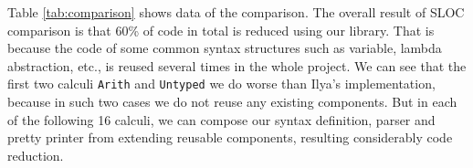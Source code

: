 Table \ref{tab:comparison} shows data of the comparison. The overall result of SLOC comparison is that 60\% of code in total is reduced using our library. That is because the code of some common syntax structures such as variable, lambda abstraction, etc., is reused several times in the whole project. We can see that the first two calculi \lstinline{Arith} and \lstinline{Untyped} we do worse than Ilya's implementation, because in such two cases we do not reuse any existing components. But in each of the following 16 calculi, we can compose our syntax definition, parser and pretty printer from extending reusable components, resulting considerably code reduction.
